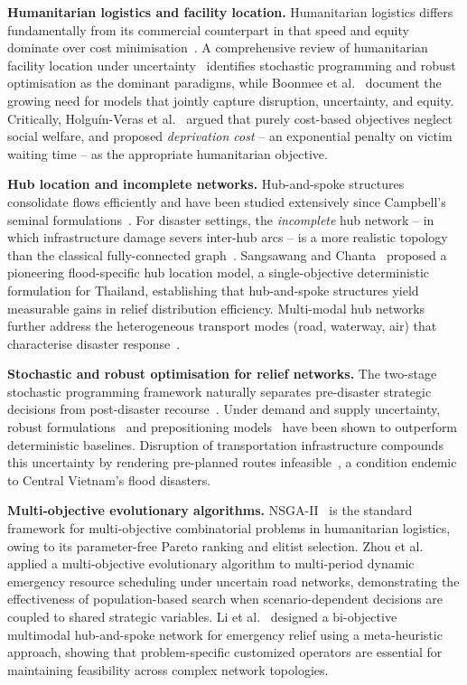 \documentclass{llncs}
\begin{document}
\textbf{Humanitarian logistics and facility location.}
Humanitarian logistics differs fundamentally from its commercial counterpart in that speed and equity dominate over cost minimisation~\cite{van2006humanitarian, kovacs2007humanitarian}.
A comprehensive review of humanitarian facility location under uncertainty~\cite{donmez2021humanitarian} identifies stochastic programming and robust optimisation as the dominant paradigms, while Boonmee et al.~\cite{boonmee2017facility} document the growing need for models that jointly capture disruption, uncertainty, and equity.
Critically, Holgu{\'i}n-Veras et al.~\cite{HolguinVeras2012, holguin2013appropriate} argued that purely cost-based objectives neglect social welfare, and proposed \emph{deprivation cost} -- an exponential penalty on victim waiting time -- as the appropriate humanitarian objective.

\textbf{Hub location and incomplete networks.}
Hub-and-spoke structures consolidate flows efficiently and have been studied extensively since Campbell's seminal formulations~\cite{campbell1994integer}.
For disaster settings, the \emph{incomplete} hub network -- in which infrastructure damage severs inter-hub arcs -- is a more realistic topology than the classical fully-connected graph~\cite{alumur2009incomplete}.
Sangsawang and Chanta~\cite{sangsawang2020capacitated} proposed a pioneering flood-specific hub location model, a single-objective deterministic formulation for Thailand, establishing that hub-and-spoke structures yield measurable gains in relief distribution efficiency.
Multi-modal hub networks further address the heterogeneous transport modes (road, waterway, air) that characterise disaster response~\cite{Li2023}.

\textbf{Stochastic and robust optimisation for relief networks.}
The two-stage stochastic programming framework naturally separates pre-disaster strategic decisions from post-disaster recourse~\cite{elci2018chance, tofighi2016humanitarian}.
Under demand and supply uncertainty, robust formulations~\cite{Yahyaei2019, sun2022novel} and prepositioning models~\cite{abazari2021prepositioning} have been shown to outperform deterministic baselines.
Disruption of transportation infrastructure compounds this uncertainty by rendering pre-planned routes infeasible~\cite{salman2015emergency}, a condition endemic to Central Vietnam's flood disasters.

\textbf{Multi-objective evolutionary algorithms.}
NSGA-II~\cite{deb2002fast} is the standard framework for multi-objective
combinatorial problems in humanitarian logistics, owing to its parameter-free
Pareto ranking and elitist selection.
Zhou et al.~\cite{Zhou2017} applied a multi-objective evolutionary algorithm
to multi-period dynamic emergency resource scheduling under uncertain road
networks, demonstrating the effectiveness of population-based search when
scenario-dependent decisions are coupled to shared strategic variables.
Li et al.~\cite{Li2023} designed a bi-objective multimodal hub-and-spoke
network for emergency relief using a meta-heuristic approach, showing that
problem-specific customized operators are essential for maintaining feasibility
across complex network topologies.
\end{document}
